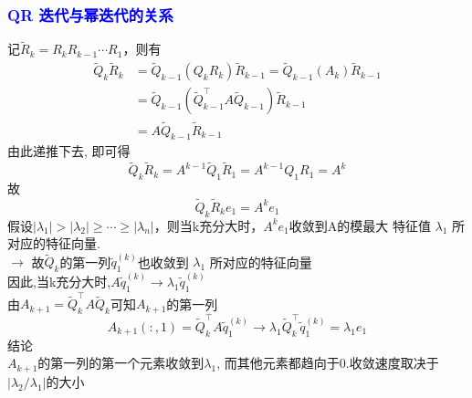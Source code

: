 \documentclass[12pt,a4paper]{article}
\begin{document}
	\subsubsection{\textcolor{blue}{QR 迭代与幂迭代的关系}}
	记$\tilde{R}_{k}=R_{k} R_{k-1} \cdots R_{1}$，则有
	$$
	\begin{aligned} 
	\tilde{Q}_{k} \tilde{R}_{k} &=\tilde{Q}_{k-1}\left(Q_{k} R_{k}\right) \tilde{R}_{k-1}=\tilde{Q}_{k-1}\left(A_{k}\right) \tilde{R}_{k-1} \\ 
	&=\tilde{Q}_{k-1}\left(\tilde{Q}_{k-1}^{\top} A \tilde{Q}_{k-1}\right) \tilde{R}_{k-1} \\ 
	&=A \tilde{Q}_{k-1} \tilde{R}_{k-1} 
	\end{aligned}
	$$
	由此递推下去, 即可得
	$$
	\tilde{Q}_{k} \tilde{R}_{k}=A^{k-1} \tilde{Q}_{1} \tilde{R}_{1}=A^{k-1} Q_{1} R_{1}=A^{k}
	$$
	故
	$$
	\tilde{Q}_{k} \tilde{R}_{k} e_{1}=A^{k} e_{1}
	$$
	假设$\left|\lambda_{1}\right|>\left|\lambda_{2}\right| \geq \cdots \geq\left|\lambda_{n}\right|$，则当k充分大时，$A^{k} e_{1}$收敛到A的模最大 特征值 $\lambda_{1}$ 所对应的特征向量.\\
	$\rightarrow$ 故$\tilde{Q}_{k}$的第一列$\tilde{q}_{1}^{(k)}$也收敛到 $\lambda_{1}$ 所对应的特征向量\\
	因此,当k充分大时,$A \tilde{q}_{1}^{(k)} \rightarrow \lambda_{1} \tilde{q}_{1}^{(k)}$\\
	由$A_{k+1}=\tilde{Q}_{k}^{\top} A \tilde{Q}_{k}$可知$A_{k+1}$的第一列
	$$
	A_{k+1}( :, 1)=\tilde{Q}_{k}^{\top} A \tilde{q}_{1}^{(k)} \rightarrow \lambda_{1} \tilde{Q}_{k}^{\top} \tilde{q}_{1}^{(k)}=\lambda_{1} e_{1}
	$$
	结论\\
	$A_{k+1}$的第一列的第一个元素收敛到$\lambda_{1}$, 而其他元素都趋向于0.收敛速度取决于$|\lambda_{2}/\lambda_{1}|$的大小
	
\end{document}

